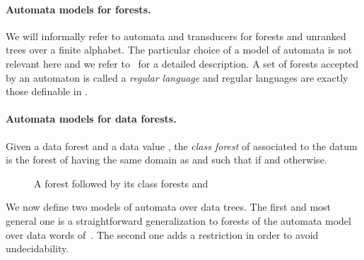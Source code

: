 \documentclass{CSML}
\begin{document}
\paragraph{Automata models for forests.} 
We will informally refer to automata and transducers 
for forests and unranked trees over a finite alphabet. 
The particular choice of a model of automata is not relevant here 
and we refer to~\cite[Chapters~1,6,8]{tata} for a detailed description. 
A set of forests accepted by an automaton is called a \emph{regular language} 
and regular languages are exactly those definable in .  


\paragraph{Automata models for data forests.}  
Given a data forest  
and a data value , the \emph{class forest}\label{def:class-forest} 
 of  associated to the datum  
is the forest of  having the same domain as 
and such that  if  and  otherwise.

\begin{figure}[h!]
\hspace{-8.7 cm}
  \caption{A forest  followed by its class forests
     and }
  \label{fig-class-forest}
\end{figure}

\noindent We now define two models of automata over data trees. The first and most general
one is a straightforward generalization to forests of the automata model over
data words of~\cite{BDMSS11}. The second one adds a restriction in order to
avoid undecidability.
\end{document}
